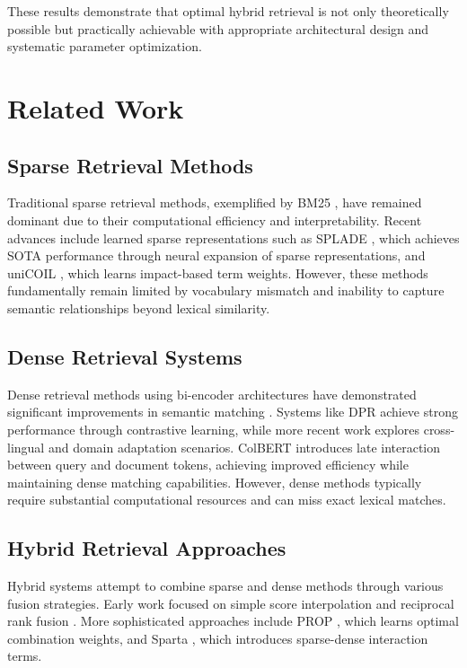 \documentclass{neurips_2025}
\begin{document}
These results demonstrate that optimal hybrid retrieval is not only theoretically possible but practically achievable with appropriate architectural design and systematic parameter optimization.

\section{Related Work}

\subsection{Sparse Retrieval Methods}

Traditional sparse retrieval methods, exemplified by BM25 \cite{robertson2009probabilistic}, have remained dominant due to their computational efficiency and interpretability. Recent advances include learned sparse representations such as SPLADE \cite{formal2021splade}, which achieves SOTA performance through neural expansion of sparse representations, and uniCOIL \cite{lin2021few}, which learns impact-based term weights. However, these methods fundamentally remain limited by vocabulary mismatch and inability to capture semantic relationships beyond lexical similarity.

\subsection{Dense Retrieval Systems}

Dense retrieval methods using bi-encoder architectures have demonstrated significant improvements in semantic matching \cite{karpukhin2020dense, xiong2020approximate}. Systems like DPR achieve strong performance through contrastive learning, while more recent work explores cross-lingual \cite{asai2021learning} and domain adaptation \cite{thakur2021domain} scenarios. ColBERT \cite{khattab2020colbert} introduces late interaction between query and document tokens, achieving improved efficiency while maintaining dense matching capabilities. However, dense methods typically require substantial computational resources and can miss exact lexical matches.

\subsection{Hybrid Retrieval Approaches}

Hybrid systems attempt to combine sparse and dense methods through various fusion strategies. Early work focused on simple score interpolation \cite{luan2021sparse} and reciprocal rank fusion \cite{cormack2009reciprocal}. More sophisticated approaches include PROP \cite{ma2021prop}, which learns optimal combination weights, and Sparta \cite{zhao2022sparta}, which introduces sparse-dense interaction terms.
\end{document}
